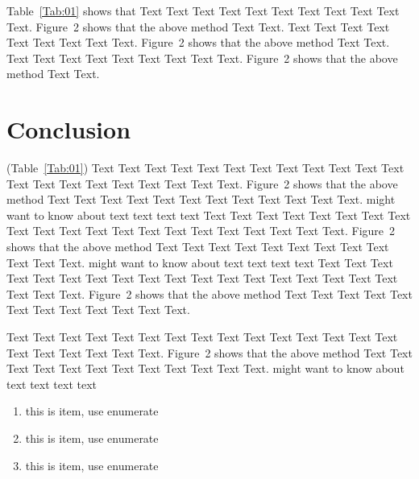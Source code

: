\documentclass{bioinfo}
\begin{document}
Table~\ref{Tab:01} shows that Text Text Text Text Text  Text Text
Text Text Text Text. Figure~2\vphantom{\ref{fig:02}} shows that
the above method Text Text. Text Text Text  Text Text Text Text
Text Text. Figure~2\vphantom{\ref{fig:02}} shows that the above
method Text Text. Text Text Text  Text Text Text Text Text Text.
Figure~2\vphantom{\ref{fig:02}} shows that the above method Text
Text.









%
%






\section{Conclusion}

 (Table~\ref{Tab:01}) Text Text Text Text Text Text  Text Text Text
Text Text Text Text Text Text  Text Text Text Text Text Text.
Figure~2\vphantom{\ref{fig:02}} shows that the above method  Text
Text Text Text  Text Text Text Text Text Text  Text Text.
\citealp{Boffelli03} might want to know about  text text text text
Text Text Text Text Text Text  Text Text Text Text Text Text Text
Text Text  Text Text Text Text Text Text.
Figure~2\vphantom{\ref{fig:02}} shows that the above method  Text
Text Text Text  Text Text Text Text Text Text  Text Text.
\citealp{Boffelli03} might want to know about  text text text text
Text Text Text Text Text Text Text Text Text Text Text Text Text
Text Text  Text Text Text Text Text Text.
Figure~2\vphantom{\ref{fig:02}} shows that the above method  Text
Text Text Text  Text Text Text Text Text Text  Text Text.



Text Text Text Text Text Text  Text Text Text Text Text Text Text
Text Text  Text Text Text Text Text Text.
Figure~2\vphantom{\ref{fig:02}} shows that the above method  Text
Text Text Text  Text Text Text Text Text Text  Text Text.
\citealp{Boffelli03} might want to know about  text text text text

\begin{enumerate}
	\item this is item, use enumerate
	\item this is item, use enumerate
	\item this is item, use enumerate
\end{enumerate}
\end{document}
